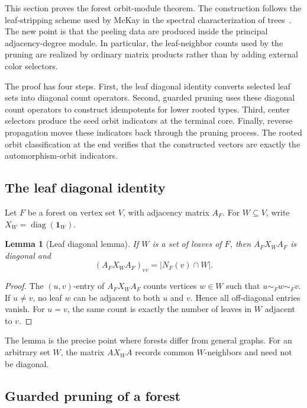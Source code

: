\documentclass[a4paper,fleqn]{cas-sc}
\newtheorem{lemma}[theorem]{Lemma}
\theoremstyle{definition}
\theoremstyle{remark}
\newcommand{\one}{\mathbf 1}
\newcommand{\diag}{\operatorname{diag}}
\begin{document}
This section proves the forest orbit-module theorem.  The construction follows
the leaf-stripping scheme used by McKay in the spectral characterization of
trees~\cite{McKay1977}.  The new point is that the peeling data are produced
inside the principal adjacency-degree module.  In particular, the leaf-neighbor
counts used by the pruning are realized by ordinary matrix products rather than
by adding external color selectors.

The proof has four steps.  First, the leaf diagonal identity converts selected
leaf sets into diagonal count operators.  Second, guarded pruning uses these
diagonal count operators to construct idempotents for lower rooted types.
Third, center selectors produce the seed orbit indicators at the terminal core.
Finally, reverse propagation moves these indicators back through the pruning
process.  The rooted orbit classification at the end verifies that the
constructed vectors are exactly the automorphism-orbit indicators.

\subsection{The leaf diagonal identity}

Let \(F\) be a forest on vertex set \(V\), with adjacency matrix \(A_F\).  For
\(W\subseteq V\), write \(X_W=\diag(\one_W)\).

\begin{lemma}[Leaf diagonal lemma]
\label{lem:leaf-diagonal}
If \(W\) is a set of leaves of \(F\), then \(A_FX_WA_F\) is diagonal and
\[
        (A_FX_WA_F)_{vv}=|N_F(v)\cap W|.
\]
\end{lemma}

\begin{proof}
The \((u,v)\)-entry of \(A_FX_WA_F\) counts vertices \(w\in W\) such that
\(u\sim_F w\sim_F v\).  If \(u\ne v\), no leaf \(w\) can be adjacent to both \(u\) and
\(v\).  Hence all off-diagonal entries vanish.  For \(u=v\), the same count is
exactly the number of leaves in \(W\) adjacent to \(v\).
\end{proof}

The lemma is the precise point where forests differ from general graphs.  For an
arbitrary set \(W\), the matrix \(AX_WA\) records common \(W\)-neighbors and need not
be diagonal.

\subsection{Guarded pruning of a forest}
\label{subsec:guarded-pruning}
\end{document}
